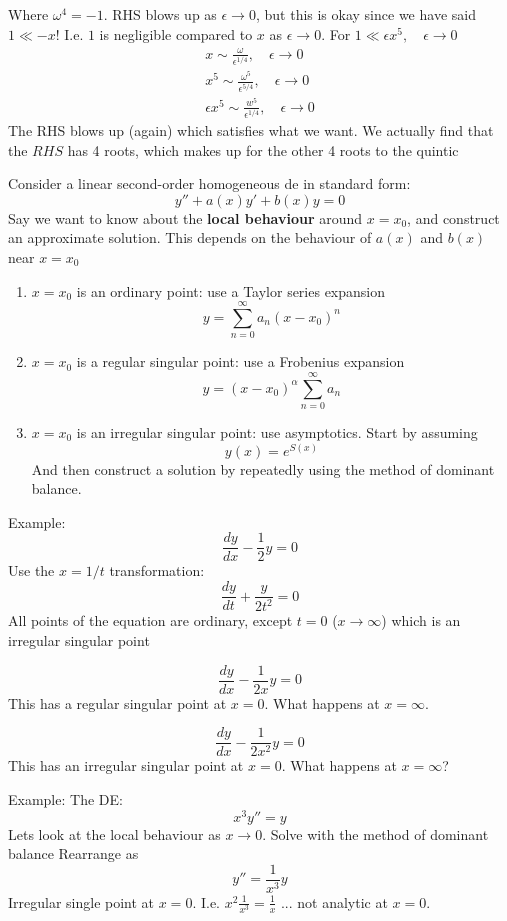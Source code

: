 \documentclass{X:/Documents/Coding/Latex/myassignment}
\begin{document}
\begin{enumerate}
    Where $\omega^4 = -1$. RHS blows up as $\epsilon\to 0$, but this is okay since we have said $1\ll -x$! I.e. $1$ is negligible compared to $x$ as $\epsilon\to0$.
    For $1\ll \epsilon x^5, \quad \epsilon\to 0$
    \begin{align*}
         x \sim \frac{\omega}{\epsilon^{1/4}}, \quad \epsilon\to0\\
         x^5 \sim \frac{\omega^5}{\epsilon^{5/4}},\quad \epsilon\to0\\
         \epsilon x^5 \sim \frac{w^5}{\epsilon^{1/4}},\quad \epsilon\to 0
    \end{align*}
    The RHS blows up (again) which satisfies what we want.
    We actually find that the $RHS$ has 4 roots, which makes up for the other 4 roots to the quintic
    \end{enumerate}
    
    Consider a linear second-order homogeneous de in standard form:
    \[y'' + a(x)y' + b(x) y = 0\]
    Say we want to know about the \textbf{local behaviour} around $x=x_0$, and construct an approximate solution. This depends on the behaviour of $a(x)$ and $b(x)$ near $x=x_0$
    \begin{enumerate}
        \item $x=x_0$ is an ordinary point: use a Taylor series expansion
        \[y = \sum_{n=0}^\infty a_n(x-x_0)^n\]
        \item $x=x_0$ is a regular singular point: use a Frobenius expansion
        \[y = (x-x_0)^\alpha \sum_{n=0}^\infty a_n\]
        \item $x=x_0$ is an irregular singular point: use asymptotics. Start by assuming
        \[y(x) = e^{S(x)}\]
        And then construct a solution by repeatedly using the method of dominant balance.
    \end{enumerate}
    Example:
    \[\frac{dy}{dx} - \frac12 y = 0\]
    Use the $x=1/t$ transformation:
    \[\frac{dy}{dt} + \frac{y}{2t^2} = 0\]
    All points of the equation are ordinary, except $t=0$ ($x\to\infty$) which is an irregular singular point 
    
    \[\frac{dy}{dx} - \frac1{2x} y = 0\]
    This has a regular singular point at $x=0$. What happens at $x=\infty$.

    
    \[\frac{dy}{dx} - \frac{1}{2x^2} y =0 \]
    This has an irregular singular point at $x=0$. What happens at $x=\infty$?

    Example:
    The DE:
    \[x^3 y'' = y\]
    Lets look at the local behaviour as $x\to 0$. 
    Solve with the method of dominant balance
    Rearrange as
    \[y'' = \frac1{x^3} y\]
Irregular single point at $x=0$.
I.e. $x^2\frac{1}{x^3} = \frac1x$ ... not analytic at $x=0$.
\end{document}
